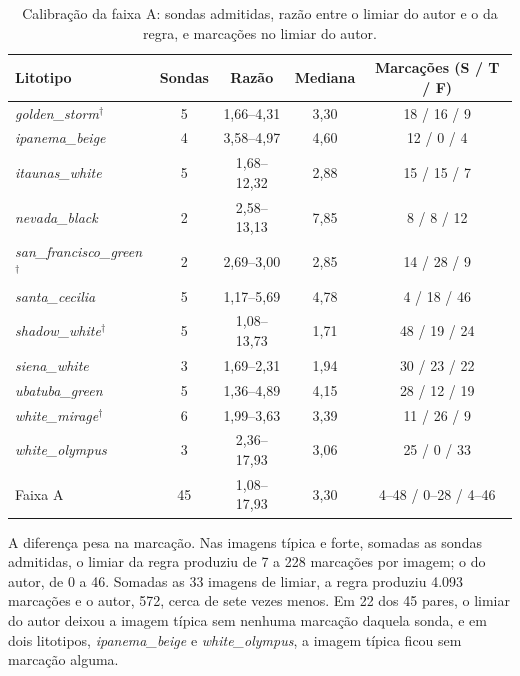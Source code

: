 \begin{table}[ht]
  \caption{Calibração da faixa A: sondas admitidas, razão entre o limiar do autor e o da regra, e marcações no limiar do autor.}
  \label{tab:calib_faixa_a}
  \centering
  \small
  \begin{tabular}{lcccc}
    \hline
    \bfseries Litotipo & \bfseries Sondas & \bfseries Razão & \bfseries Mediana & \bfseries Marcações (S / T / F) \\
    \hline
    \textit{golden\_storm}$^{\dagger}$        & 5 & 1,66--4,31  & 3,30 & 18 / 16 / 9  \\
    \textit{ipanema\_beige}                   & 4 & 3,58--4,97  & 4,60 & 12 / 0 / 4   \\
    \textit{itaunas\_white}                   & 5 & 1,68--12,32 & 2,88 & 15 / 15 / 7  \\
    \textit{nevada\_black}                    & 2 & 2,58--13,13 & 7,85 & 8 / 8 / 12   \\
    \textit{san\_francisco\_green}$^{\dagger}$ & 2 & 2,69--3,00  & 2,85 & 14 / 28 / 9  \\
    \textit{santa\_cecilia}                   & 5 & 1,17--5,69  & 4,78 & 4 / 18 / 46  \\
    \textit{shadow\_white}$^{\dagger}$        & 5 & 1,08--13,73 & 1,71 & 48 / 19 / 24 \\
    \textit{siena\_white}                     & 3 & 1,69--2,31  & 1,94 & 30 / 23 / 22 \\
    \textit{ubatuba\_green}                   & 5 & 1,36--4,89  & 4,15 & 28 / 12 / 19 \\
    \textit{white\_mirage}$^{\dagger}$        & 6 & 1,99--3,63  & 3,39 & 11 / 26 / 9  \\
    \textit{white\_olympus}                   & 3 & 2,36--17,93 & 3,06 & 25 / 0 / 33  \\
    \hline
    Faixa A                                   & 45 & 1,08--17,93 & 3,30 & 4--48 / 0--28 / 4--46 \\
    \hline
  \end{tabular}
\end{table}

A diferença pesa na marcação. Nas imagens típica e forte, somadas as sondas admitidas, o limiar da regra produziu de 7 a 228 marcações por imagem; o do autor, de 0 a 46. Somadas as 33 imagens de limiar, a regra produziu 4.093 marcações e o autor, 572, cerca de sete vezes menos. Em 22 dos 45 pares, o limiar do autor deixou a imagem típica sem nenhuma marcação daquela sonda, e em dois litotipos, \textit{ipanema\_beige} e \textit{white\_olympus}, a imagem típica ficou sem marcação alguma.

